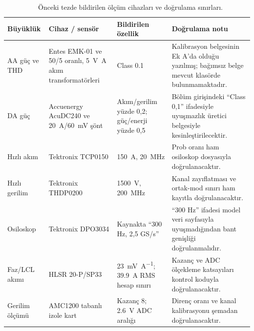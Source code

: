 \begin{table}[htbp]
  \centering
  \caption{\eskitezetiketi\ \juriistegietiketi\ Önceki tezde bildirilen ölçüm cihazları ve doğrulama sınırları.}
  \label{tab:olcum-cihazlari}
  \footnotesize
  \begin{tabularx}{\textwidth}{p{} p{} p{} X}
    \toprule
    Büyüklük & Cihaz / sensör & Bildirilen özellik & Doğrulama notu \\
    \midrule
    AA güç ve THD & Entes EMK-01 ve 50/5 oranlı, \SI{5}{\volt\ampere} akım transformatörleri & Class 0.1 & Kalibrasyon belgesinin Ek A'da olduğu yazılmış; bağımsız belge mevcut klasörde bulunmamaktadır. \\
    DA güç & Accuenergy AcuDC240 ve \SI{20}{\ampere}/\SI{60}{\milli\volt} şönt & Akım/gerilim yüzde 0,2; güç/enerji yüzde 0,5 & Bölüm girişindeki ``Class 0,1'' ifadesiyle uyuşmazlık üretici belgesiyle kesinleştirilecektir. \\
    Hızlı akım & Tektronix TCP0150 & \SI{150}{\ampere}, \SI{20}{\mega\hertz} & Prob oranı ham osiloskop dosyasıyla doğrulanacaktır. \\
    Hızlı gerilim & Tektronix THDP0200 & \SI{1500}{\volt}, \SI{200}{\mega\hertz} & Kanal zayıflatması ve ortak-mod sınırı ham kayıtla doğrulanacaktır. \\
    Osiloskop & Tektronix DPO3034 & Kaynakta ``300 Hz, 2,5 GS/s'' & ``300 Hz'' ifadesi model veri sayfasıyla uyuşmadığından bant genişliği doğrulanmalıdır. \\
    Faz/LCL akımı & HLSR 20-P/SP33 & \SI{23}{\milli\volt\per\ampere}; \SI{39.9}{\ampere} RMS hesap sınırı & Kazanç ve ADC ölçekleme katsayıları kontrol koduyla doğrulanacaktır. \\
    Gerilim ölçümü & AMC1200 tabanlı izole kart & Kazanç 8; \SI{2.6}{\volt} ADC aralığı & Direnç oranı ve kanal kalibrasyonu şemadan doğrulanacaktır. \\
    \bottomrule
  \end{tabularx}
\end{table}



